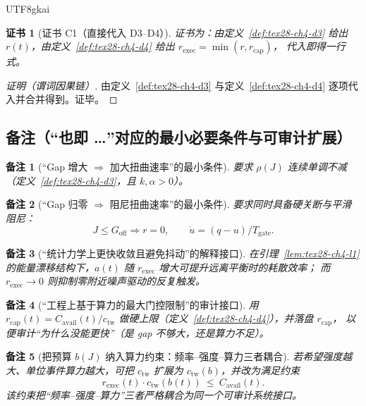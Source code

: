 \documentclass[12pt]{article}
\newtheorem{remark}{备注}[section]
\newtheorem{Certificate}{证书}[section]
\begin{document}
\begin{CJK*}{UTF8}{gkai}
\begin{Certificate}[证书 C1（直接代入 D3--D4）]
\label{cert:tex28-ch4-c1}
证书为：由定义~\ref{def:tex28-ch4-d3} 给出 $r(t)$，由定义~\ref{def:tex28-ch4-d4} 给出 $r_{\mathrm{exec}}=\min(r,r_{\mathrm{cap}})$，
  代入即得一行式。
\end{Certificate}

\begin{proof}[证明（谓词因果链）]
由定义~\ref{def:tex28-ch4-d3} 与定义~\ref{def:tex28-ch4-d4} 逐项代入并合并得到。证毕。
\end{proof}

\subsection{备注（“也即 …”对应的最小必要条件与可审计扩展）}
\label{subsec:tex28-ch4-remarks}

\begin{remark}[“Gap 增大 $\Rightarrow$ 加大扭曲速率”的最小条件]
要求 $\rho(J)$ 连续单调不减（定义~\ref{def:tex28-ch4-d3}，且 $k,\alpha>0$）。
\end{remark}

\begin{remark}[“Gap 归零 $\Rightarrow$ 阻尼扭曲速率”的最小条件]
要求同时具备硬关断与平滑阻尼：
\[
  J\le G_{\mathrm{off}}\Rightarrow r=0,
  \qquad
  \dot u=(q-u)/T_{\mathrm{gate}}.
\]
\end{remark}

\begin{remark}[“统计力学上更快收敛且避免抖动”的解释接口]
在引理~\ref{lem:tex28-ch4-l1} 的能量漂移结构下，$a(t)$ 随 $r_{\mathrm{exec}}$ 增大可提升远离平衡时的耗散效率；
而 $r_{\mathrm{exec}}\to 0$ 则抑制零附近噪声驱动的反复触发。
\end{remark}

\begin{remark}[“工程上基于算力的最大门控限制”的审计接口]
用 $r_{\mathrm{cap}}(t)=C_{\mathrm{avail}}(t)/c_{\mathrm{tw}}$ 做硬上限（定义~\ref{def:tex28-ch4-d4}），并落盘 $r_{\mathrm{cap}}$，
以便审计“为什么没能更快”（是 gap 不够大，还是算力不足）。
\end{remark}

\begin{remark}[把预算 $b(J)$ 纳入算力约束：频率--强度--算力三者耦合]
若希望强度越大、单位事件算力越大，可把 $c_{\mathrm{tw}}$ 扩展为 $c_{\mathrm{tw}}(b)$，并改为满足约束
\[
  r_{\mathrm{exec}}(t)\cdot c_{\mathrm{tw}}(b(t))\ \le\ C_{\mathrm{avail}}(t).
\]
该约束把“频率--强度--算力”三者严格耦合为同一个可审计系统接口。
\end{remark}


\end{CJK*}
\end{document}
